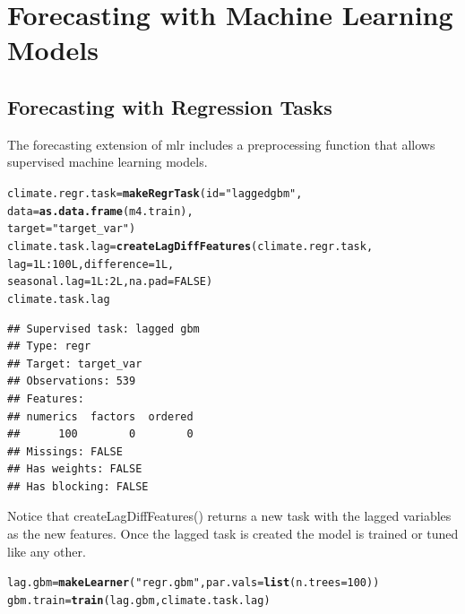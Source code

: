 \documentclass{article}\usepackage[]{graphicx}\usepackage[]{color}
\makeatletter
\newcommand{\hlnum}[1]{\textcolor[rgb]{0.686,0.059,0.569}{#1}}%
\newcommand{\hlstr}[1]{\textcolor[rgb]{0.192,0.494,0.8}{#1}}%
\newcommand{\hlopt}[1]{\textcolor[rgb]{0,0,0}{#1}}%
\newcommand{\hlstd}[1]{\textcolor[rgb]{0.345,0.345,0.345}{#1}}%
\newcommand{\hlkwb}[1]{\textcolor[rgb]{0.69,0.353,0.396}{#1}}%
\newcommand{\hlkwc}[1]{\textcolor[rgb]{0.333,0.667,0.333}{#1}}%
\newcommand{\hlkwd}[1]{\textcolor[rgb]{0.737,0.353,0.396}{\textbf{#1}}}%
\newenvironment{kframe}{%
 \def\at@end@of@kframe{}%
 \ifinner\ifhmode%
  \def\at@end@of@kframe{\end{minipage}}%
  \begin{minipage}{\columnwidth}%
 \fi\fi%
 \def\FrameCommand##1{\hskip\@totalleftmargin \hskip-\fboxsep
 \colorbox{shadecolor}{##1}\hskip-\fboxsep
     \hskip-\linewidth \hskip-\@totalleftmargin \hskip\columnwidth}%
 \MakeFramed {\advance\hsize-\width
   \@totalleftmargin\z@ \linewidth\hsize
   \@setminipage}}%
 {\par\unskip\endMakeFramed%
 \at@end@of@kframe}
\newenvironment{knitrout}{}{} %
\theoremstyle{definition}
\newcommand\code{\@codex}
\def\@codex#1{{\normalfont\ttfamily\hyphenchar\font=-1 #1}}
\newcommand{\pkg}[1]{{\fontseries{b}\selectfont #1}}
\makeatother
\begin{document}
\section{Forecasting with Machine Learning Models}

\subsection{Forecasting with Regression Tasks}

The forecasting extension of \pkg{mlr} includes a preprocessing function that allows supervised machine learning models.

\begin{knitrout}
\color{fgcolor}\begin{kframe}
\begin{alltt}
\hlstd{climate.regr.task} \hlkwb{=} \hlkwd{makeRegrTask}\hlstd{(}\hlkwc{id} \hlstd{=} \hlstr{"lagged gbm"}\hlstd{,}
                                 \hlkwc{data} \hlstd{=} \hlkwd{as.data.frame}\hlstd{(m4.train),}
                                 \hlkwc{target} \hlstd{=} \hlstr{"target_var"}\hlstd{)}
\hlstd{climate.task.lag} \hlkwb{=} \hlkwd{createLagDiffFeatures}\hlstd{(climate.regr.task,}
                                         \hlkwc{lag} \hlstd{=} \hlnum{1L}\hlopt{:}\hlnum{100L}\hlstd{,} \hlkwc{difference} \hlstd{=} \hlnum{1L}\hlstd{,}
                                         \hlkwc{seasonal.lag} \hlstd{=} \hlnum{1L}\hlopt{:}\hlnum{2L}\hlstd{,} \hlkwc{na.pad}\hlstd{=}\hlnum{FALSE}\hlstd{)}
\hlstd{climate.task.lag}
\end{alltt}
\begin{verbatim}
## Supervised task: lagged gbm
## Type: regr
## Target: target_var
## Observations: 539
## Features:
## numerics  factors  ordered 
##      100        0        0 
## Missings: FALSE
## Has weights: FALSE
## Has blocking: FALSE
\end{verbatim}
\end{kframe}
\end{knitrout}

Notice that \code{createLagDiffFeatures()} returns a new task with the lagged variables as the new features. Once the lagged task is created the model is trained or tuned like any other.

\begin{knitrout}
\color{fgcolor}\begin{kframe}
\begin{alltt}
\hlstd{lag.gbm} \hlkwb{=} \hlkwd{makeLearner}\hlstd{(}\hlstr{"regr.gbm"}\hlstd{,} \hlkwc{par.vals} \hlstd{=} \hlkwd{list}\hlstd{(}\hlkwc{n.trees} \hlstd{=} \hlnum{100}\hlstd{))}
\hlstd{gbm.train} \hlkwb{=} \hlkwd{train}\hlstd{(lag.gbm, climate.task.lag)}
\end{alltt}
\end{kframe}
\end{knitrout}
\end{document}
